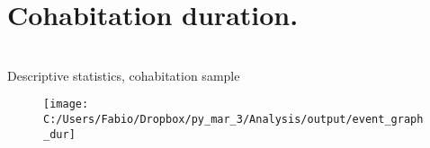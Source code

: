 \documentclass[12pt]{article}
\begin{document}












%
 \section{Cohabitation duration.}
 

\begin{table}[!htbp]\centering
	\caption{\\Descriptive statistics, cohabitation sample}
	\label{table:sum_coh}
	
\end{table} 
 
 
 
 


 
  \begin{figure}
 	\centering
 	\texttt{[image: C:/Users/Fabio/Dropbox/py\_mar\_3/Analysis/output/event\_graph\_dur]}
 	\caption{}
 	\label{fig:eventgraphdur}
 \end{figure}


\end{document}
